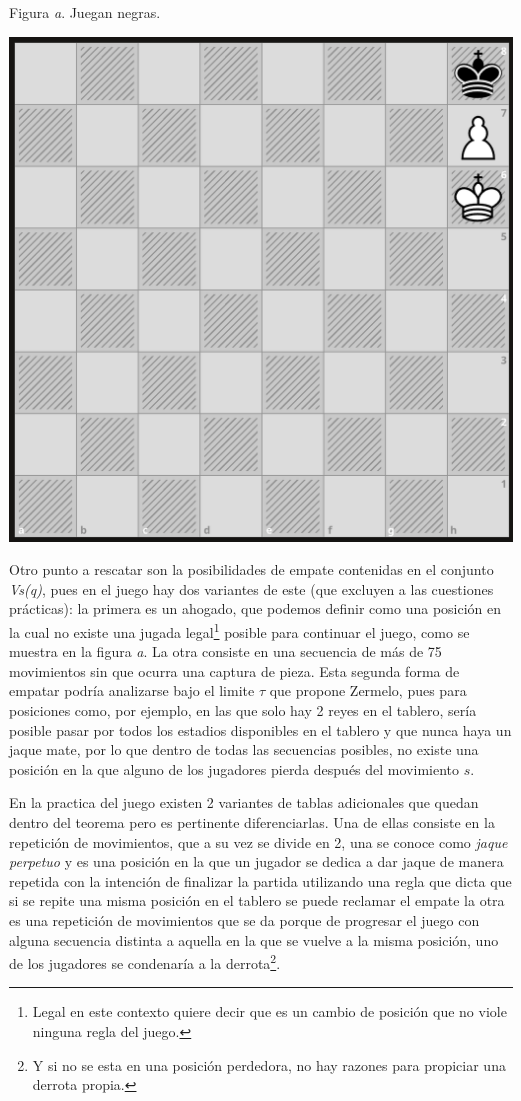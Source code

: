 \documentclass[twoside,openright,12pt,a4paper,spanish]{book}
\begin{document}
\begin{center} 
Figura \emph{a}. Juegan negras.

\medskip
\includegraphics[width=8.0 cm,height=8.0 cm]{ahogado_1.png}

\end{center}
\medskip


Otro punto a rescatar son  la posibilidades de empate contenidas en el conjunto \emph{Vs(q)}, pues en el juego hay dos variantes de este (que excluyen a las cuestiones prácticas): la primera es un ahogado, que podemos definir como una posición en la cual no existe una jugada legal\footnote{Legal en este contexto quiere decir que es un cambio de posición que no viole ninguna regla del juego.} posible para continuar el juego, como se muestra en la figura \emph{a}. La otra consiste en una secuencia de más de 75 \cite[p. 42]{feda_manual_2021} movimientos sin que ocurra una captura de pieza. Esta segunda forma de empatar podría analizarse bajo el limite $\tau$ que propone Zermelo, pues para posiciones como, por ejemplo, en las que solo hay 2 reyes en el tablero, sería posible pasar por todos los estadios disponibles en el tablero y que nunca haya un jaque mate, por lo que dentro de todas las secuencias posibles, no existe una posición en la que alguno de los jugadores pierda después del movimiento $s$.

En la practica del juego existen 2 variantes de tablas adicionales que quedan dentro del teorema pero es pertinente diferenciarlas. Una de ellas consiste en la repetición de movimientos, que a su vez se divide en 2, una se conoce como \textit{jaque perpetuo} y es una posición en la que un jugador se dedica a dar jaque de manera repetida con la intención de finalizar la partida utilizando una regla que dicta que si se repite una misma posición en el tablero se puede reclamar el empate \cite[p.p. 41-42]{feda_manual_2021} la otra es una repetición de movimientos que se da porque de progresar el juego con alguna secuencia distinta a aquella en la que se vuelve a la misma posición, uno de los jugadores se condenaría a la derrota\footnote{Y si no se esta en una posición perdedora, no hay razones para propiciar una derrota propia.}.
\end{document}
